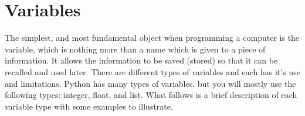 
\section{Variables}
The simplest, and most fundamental object when programming a computer
is the variable, which is nothing more than a name which is given to a
piece of information. It allows the information to be saved (stored)
so that it can be recalled and used later.   There
are different types of variables and each has it's use and
limitations.  Python has many types of variables, but you will mostly
use the following types: integer, float, and list.  What follows is a
brief description of each variable type with some examples to
illustrate.

